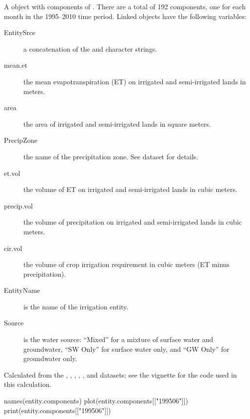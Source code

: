 \documentclass[letterpaper]{book}
\begin{document}
\begin{Format}
A  object with components of .
There are a total of 192 components, one for each month in the 1995--2010 time period.
Linked  objects have the following variables:
\begin{description}

\item[EntitySrce] a concatenation of the  and  character strings.
\item[mean.et] the mean evapotranspiration (ET) on irrigated and semi-irrigated lands in meters.
\item[area] the area of irrigated and semi-irrigated lands in square meters.
\item[PrecipZone] the name of the precipitation zone.
See  dataset for details.
\item[et.vol] the volume of ET on irrigated and semi-irrigated lands in cubic meters.
\item[precip.vol] the volume of precipitation on irrigated and semi-irrigated lands in cubic meters.
\item[cir.vol] the volume of crop irrigation requirement in cubic meters (ET minus precipitation).
\item[EntityName] is the name of the irrigation entity.
\item[Source] is the water source: ``Mixed'' for a mixture of surface water and groundwater, ``SW Only'' for surface water only, and ``GW Only'' for groundwater only.

\end{description}

\end{Format}
%
\begin{Source}\relax
Calculated from the , , , , , and  datasets;
see the  vignette for the \R{} code used in this calculation.
\end{Source}
%
\begin{Examples}
\begin{ExampleCode}
names(entity.components)
plot(entity.components[["199506"]])
print(entity.components[["199506"]])
\end{ExampleCode}
\end{Examples}
\end{document}
